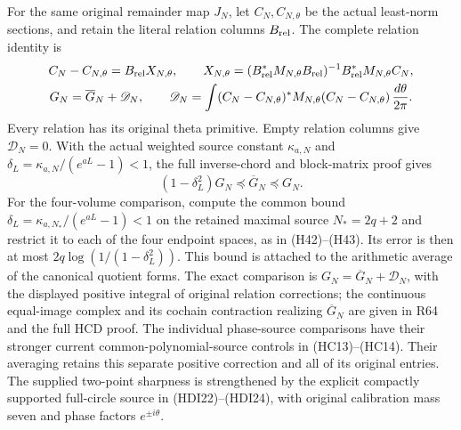 For the same original remainder map $J_N$, let $C_N,C_{N,\theta}$
be the actual least-norm sections, and retain the literal relation
columns $B_{\rm rel}$. The complete relation identity is
\[
\begin{gathered}
 C_N-C_{N,\theta}=B_{\rm rel}X_{N,\theta},\qquad
 X_{N,\theta}=(B_{\rm rel}^*M_{N,\theta}B_{\rm rel})^{-1}
                  B_{\rm rel}^*M_{N,\theta}C_N,\\
 G_N=\overline G_N+\mathscr D_N,\qquad
 \mathscr D_N=\int(C_N-C_{N,\theta})^*M_{N,\theta}
                         (C_N-C_{N,\theta})\,\frac{d\theta}{2\pi}.
\end{gathered}
\]
Every relation has its original theta primitive. Empty relation
columns give $\mathscr D_N=0$. With the actual weighted source
constant $\kappa_{a,N}$ and $\delta_L=\kappa_{a,N}/(e^{aL}-1)<1$,
the full inverse-chord and block-matrix proof gives
\[
 (1-\delta_L^2)G_N\preceq\overline G_N\preceq G_N.
\]
For the four-volume comparison, compute the common bound
$\delta_L=\kappa_{a,N_*}/(e^{aL}-1)<1$ on the retained maximal
source $N_*=2q+2$ and restrict it to each of the four endpoint
spaces, as in (H42)--(H43). Its error is then at most
$2q\log(1/(1-\delta_L^2))$.  This bound is attached to the arithmetic
average of the canonical quotient forms.  The exact comparison
is \(G_N=\overline G_N+\mathscr D_N\), with the displayed
positive integral of original relation corrections; the
continuous equal-image complex and its cochain contraction
realizing \(\overline G_N\) are given in R64 and the full HCD
proof.  The individual phase-source comparisons have their
stronger current common-polynomial-source controls in
(HC13)--(HC14).  Their averaging retains this separate
positive correction and all of its original entries. The supplied two-point sharpness
is strengthened by the explicit compactly supported full-circle
source in (HDI22)--(HDI24), with original calibration mass seven
and phase factors $e^{\pm i\theta}$.

